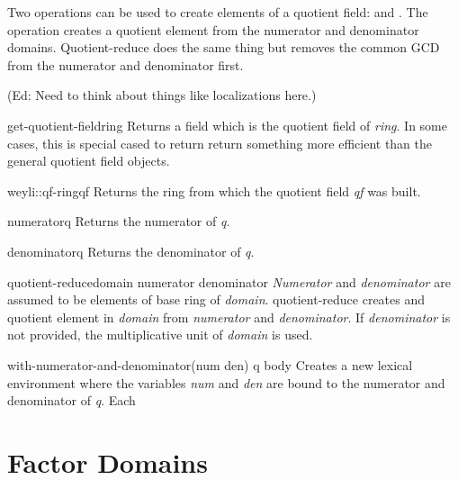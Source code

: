Two operations can be used to create elements of a quotient field:
 and .  The operation
 creates a quotient element from the
numerator and denominator domains.  {\sf Quotient-reduce} does the
same thing but removes the common GCD from the numerator and
denominator first.

(Ed: Need to think about things like localizations here.)

\begin{functiondef}{get-quotient-field}{ring}
Returns a field which is the quotient field of {\em ring\/}.  In some
cases, this is special cased to return return something more efficient
than the general quotient field objects.
\end{functiondef}

\begin{functiondef}{weyli::qf-ring}{qf}
Returns the ring from which the quotient field {\em qf} was built.
\end{functiondef}

\begin{functiondef}{numerator}{q}
Returns the numerator of {\em q\/}.
\end{functiondef}

\begin{functiondef}{denominator}{q}
Returns the denominator of {\em q\/}.
\end{functiondef}

\begin{functiondef}{quotient-reduce}{domain numerator \optional denominator}
{\em Numerator} and {\em denominator} are assumed to be elements of
base ring of {\em domain\/}.  {\sf quotient-reduce} creates and
quotient element in {\em domain} from {\em numerator} and {\em
denominator\/}.  If {\em denominator} is not provided, the
multiplicative unit of {\em domain} is used.
\end{functiondef}

\begin{functiondef}{with-numerator-and-denominator}{(num den) q \body
body} 
Creates a new lexical environment where the variables {\em num} and
{\em den} are bound to the numerator and denominator of {\em q\/}.
Each
\end{functiondef}


\section{Factor Domains}
\label{FactorDomains:Sec}

